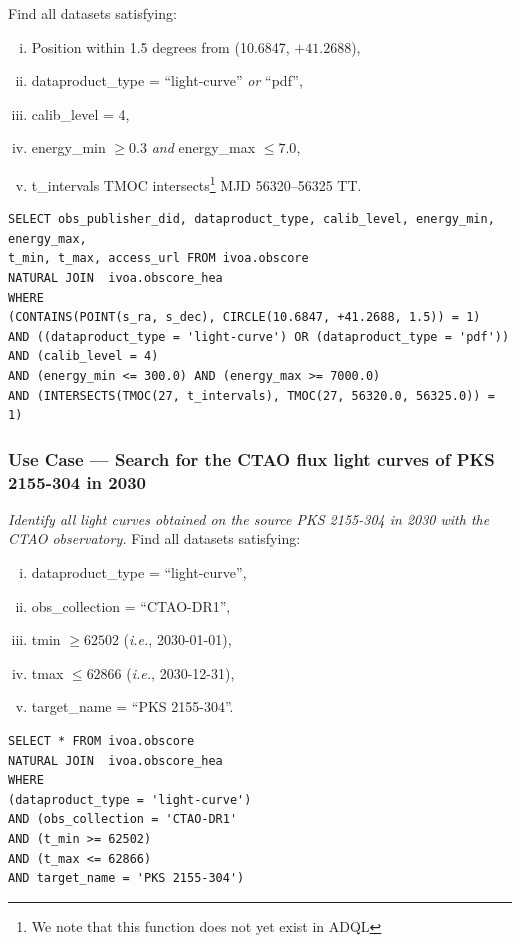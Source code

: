 
\medskip
\noindent Find all datasets satisfying:
\begin{enumerate}[(i)]
  \item Position within 1.5 degrees from (10.6847, $+41.2688$),
  \item dataproduct\_type = ``light-curve'' {\em or\/} ``pdf'',
  \item calib\_level = 4,
   \item energy\_min $\geq 0.3$ {\em and\/} energy\_max $\leq 7.0$,
  \item t\_intervals TMOC intersects\footnote{We note that this function does not yet exist in ADQL} MJD 56320--56325 TT.
\end{enumerate}


\begin{verbatim}
SELECT obs_publisher_did, dataproduct_type, calib_level, energy_min, energy_max, 
t_min, t_max, access_url FROM ivoa.obscore
NATURAL JOIN  ivoa.obscore_hea
WHERE
(CONTAINS(POINT(s_ra, s_dec), CIRCLE(10.6847, +41.2688, 1.5)) = 1)
AND ((dataproduct_type = 'light-curve') OR (dataproduct_type = 'pdf'))
AND (calib_level = 4)
AND (energy_min <= 300.0) AND (energy_max >= 7000.0)
AND (INTERSECTS(TMOC(27, t_intervals), TMOC(27, 56320.0, 56325.0)) = 1)
\end{verbatim}

\subsubsection{Use Case --- Search for the CTAO flux light curves of PKS 2155-304 in 2030}

{\em Identify all light curves obtained on the source PKS 2155-304 in 2030 with the CTAO observatory.\/}
\medskip
\noindent Find all datasets satisfying:
\begin{enumerate}[(i)]
  \item dataproduct\_type = ``light-curve'',
  \item obs\_collection = ``CTAO-DR1'',
  \item tmin $\geq 62502$ ({\em i.e.\/}, 2030-01-01),
  \item tmax $\leq 62866$ ({\em i.e.\/}, 2030-12-31),
  \item target\_name = ``PKS 2155-304''.
\end{enumerate}

\begin{verbatim}
SELECT * FROM ivoa.obscore
NATURAL JOIN  ivoa.obscore_hea
WHERE
(dataproduct_type = 'light-curve')
AND (obs_collection = 'CTAO-DR1'
AND (t_min >= 62502)
AND (t_max <= 62866)
AND target_name = 'PKS 2155-304')
\end{verbatim}


